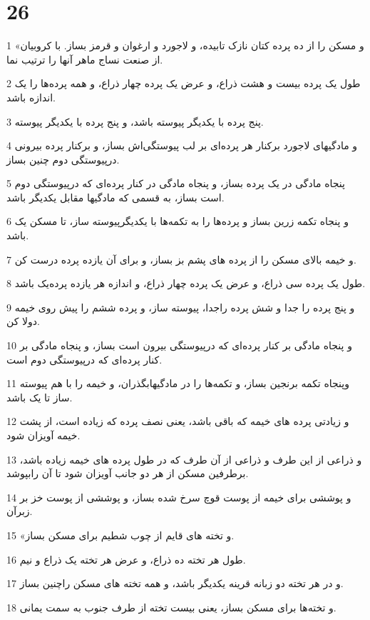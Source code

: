 \chapter{26}

\par 1 «و مسکن را از ده پرده کتان نازک تابیده، و لاجورد و ارغوان و قرمز بساز. با کروبیان از صنعت نساج ماهر آنها را ترتیب نما.
\par 2 طول یک پرده بیست و هشت ذراع، و عرض یک پرده چهار ذراع، و همه پرده‌ها را یک اندازه باشد.
\par 3 پنج پرده با یکدیگر پیوسته باشد، و پنج پرده با یکدیگر پیوسته.
\par 4 و مادگیهای لاجورد برکنار هر پرده‌ای بر لب پیوستگی‌اش بساز، و برکنار پرده بیرونی در‌پیوستگی دوم چنین بساز.
\par 5 پنجاه مادگی در یک پرده بساز، و پنجاه مادگی در کنار پرده‌ای که در‌پیوستگی دوم است بساز، به قسمی که مادگیها مقابل یکدیگر باشد.
\par 6 و پنجاه تکمه زرین بساز و پرده‌ها را به تکمه‌ها با یکدیگرپیوسته ساز، تا مسکن یک باشد.
\par 7 و خیمه بالای مسکن را از پرده های پشم بز بساز، و برای آن یازده پرده درست کن.
\par 8 طول یک پرده سی ذراع، و عرض یک پرده چهار ذراع، و اندازه هر یازده پرده‌یک باشد.
\par 9 و پنج پرده را جدا و شش پرده راجدا، پیوسته ساز، و پرده ششم را پیش روی خیمه دولا کن.
\par 10 و پنجاه مادگی بر کنار پرده‌ای که در‌پیوستگی بیرون است بساز، و پنجاه مادگی بر کنار پرده‌ای که در‌پیوستگی دوم است.
\par 11 وپنجاه تکمه برنجین بساز، و تکمه‌ها را در مادگیهابگذران، و خیمه را با هم پیوسته ساز تا یک باشد.
\par 12 و زیادتی پرده های خیمه که باقی باشد، یعنی نصف پرده که زیاده است، از پشت خیمه آویزان شود.
\par 13 و ذراعی از این طرف و ذراعی از آن طرف که در طول پرده های خیمه زیاده باشد، برطرفین مسکن از هر دو جانب آویزان شود تا آن رابپوشد.
\par 14 و پوششی برای خیمه از پوست قوچ سرخ شده بساز، و پوششی از پوست خز بر زبرآن.
\par 15 «و تخته های قایم از چوب شطیم برای مسکن بساز.
\par 16 طول هر تخته ده ذراع، و عرض هر تخته یک ذراع و نیم.
\par 17 و در هر تخته دو زبانه قرینه یکدیگر باشد، و همه تخته های مسکن راچنین بساز.
\par 18 و تخته‌ها برای مسکن بساز، یعنی بیست تخته از طرف جنوب به سمت یمانی.
